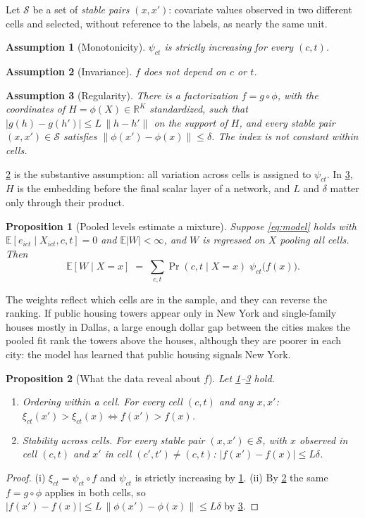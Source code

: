 \documentclass[11pt]{article}
\theoremstyle{tight}
\newtheorem{proposition}{Proposition}
\newtheorem{assumption}{Assumption}
\newcommand{\E}{\mathbb{E}}
\newcommand{\R}{\mathbb{R}}
\newcommand{\Sset}{\mathcal{S}}
\begin{document}
Let $\Sset$ be a set of \emph{stable pairs} $(x,x')$: covariate values observed in two
different cells and selected, without reference to the labels, as nearly the same unit.

\begin{assumption}[Monotonicity]\label{a:mono}
$\psi_{ct}$ is strictly increasing for every $(c,t)$.
\end{assumption}
\begin{assumption}[Invariance]\label{a:inv}
$f$ does not depend on $c$ or $t$.
\end{assumption}
\begin{assumption}[Regularity]\label{a:lip}
There is a factorization $f=g\circ\phi$, with the coordinates of $H=\phi(X)\in\R^K$
standardized, such that $|g(h)-g(h')|\le L\,\|h-h'\|$ on the support of $H$, and every stable
pair $(x,x')\in\Sset$ satisfies $\|\phi(x')-\phi(x)\|\le\delta$. The index is not constant
within cells.
\end{assumption}

\ref{a:inv} is the substantive assumption: all variation across cells is assigned to
$\psi_{ct}$. In \ref{a:lip}, $H$ is the embedding before the final scalar layer of a network,
and $L$ and $\delta$ matter only through their product.

\begin{proposition}[Pooled levels estimate a mixture]\label{p:mix}
Suppose \eqref{eq:model} holds with $\E[e_{ict}\mid X_{ict},c,t]=0$ and $\E|W|<\infty$, and $W$ is
regressed on $X$ pooling all cells. Then
\[
  \E[W\mid X=x] \;=\; \sum_{c,t}\Pr(c,t\mid X=x)\;\psi_{ct}\bigl(f(x)\bigr).
\]
\end{proposition}

The weights reflect which cells are in the sample, and they can reverse the ranking. If public
housing towers appear only in New York and single-family houses mostly in Dallas, a large enough
dollar gap between the cities makes the pooled fit rank the towers above the houses, although
they are poorer in each city: the model has learned that public housing signals New York.

\begin{proposition}[What the data reveal about $f$]\label{p:reveal}
Let \ref{a:mono}--\ref{a:lip} hold.
\begin{enumerate}[label=\textup{(\roman*)}]
\item \textup{Ordering within a cell.} For every cell $(c,t)$ and any $x,x'$:\;
      $\xi_{ct}(x')>\xi_{ct}(x)\iff f(x')>f(x)$.
\item \textup{Stability across cells.} For every stable pair $(x,x')\in\Sset$, with $x$ observed
      in cell $(c,t)$ and $x'$ in cell $(c',t')\neq(c,t)$:\; $|f(x')-f(x)|\le L\delta$.
\end{enumerate}
\end{proposition}
\begin{proof}
(i) $\xi_{ct}=\psi_{ct}\circ f$ and $\psi_{ct}$ is strictly increasing by \ref{a:mono}.
(ii) By \ref{a:inv} the same $f=g\circ\phi$ applies in both cells, so
$|f(x')-f(x)|\le L\,\|\phi(x')-\phi(x)\|\le L\delta$ by \ref{a:lip}.
\end{proof}
\end{document}
